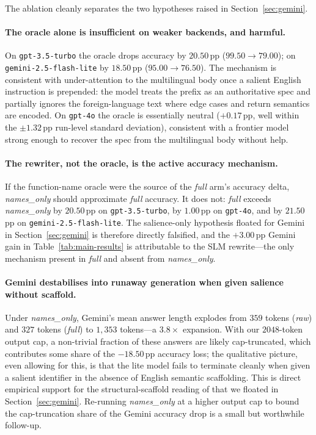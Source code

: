 \documentclass[11pt,a4paper,twocolumn]{article}
\begin{document}
The ablation cleanly separates the two hypotheses raised in Section~\ref{sec:gemini}.

\paragraph{The oracle alone is insufficient on weaker backends, and harmful.} On \texttt{gpt-3.5-turbo} the oracle drops accuracy by $20.50$\,pp ($99.50 \rightarrow 79.00$); on \texttt{gemini-2.5-flash-lite} by $18.50$\,pp ($95.00 \rightarrow 76.50$). The mechanism is consistent with under-attention to the multilingual body once a salient English instruction is prepended: the model treats the prefix as an authoritative spec and partially ignores the foreign-language text where edge cases and return semantics are encoded. On \texttt{gpt-4o} the oracle is essentially neutral ($+0.17$\,pp, well within the $\pm 1.32$\,pp run-level standard deviation), consistent with a frontier model strong enough to recover the spec from the multilingual body without help.

\paragraph{The rewriter, not the oracle, is the active accuracy mechanism.} If the function-name oracle were the source of the \textit{full} arm's accuracy delta, \textit{names\_only} should approximate \textit{full} accuracy. It does not: \textit{full} exceeds \textit{names\_only} by $20.50$\,pp on \texttt{gpt-3.5-turbo}, by $1.00$\,pp on \texttt{gpt-4o}, and by $21.50$\,pp on \texttt{gemini-2.5-flash-lite}. The salience-only hypothesis floated for Gemini in Section~\ref{sec:gemini} is therefore directly falsified, and the $+3.00$\,pp Gemini gain in Table~\ref{tab:main-results} is attributable to the SLM rewrite---the only mechanism present in \textit{full} and absent from \textit{names\_only}.

\paragraph{Gemini destabilises into runaway generation when given salience without scaffold.} Under \textit{names\_only}, Gemini's mean answer length explodes from $359$ tokens (\textit{raw}) and $327$ tokens (\textit{full}) to $1{,}353$ tokens---a $3.8\times$ expansion. With our $2048$-token output cap, a non-trivial fraction of these answers are likely cap-truncated, which contributes some share of the $-18.50$\,pp accuracy loss; the qualitative picture, even allowing for this, is that the lite model fails to terminate cleanly when given a salient identifier in the absence of English semantic scaffolding. This is direct empirical support for the structural-scaffold reading of \cite{ma2025sketch} that we floated in Section~\ref{sec:gemini}. Re-running \textit{names\_only} at a higher output cap to bound the cap-truncation share of the Gemini accuracy drop is a small but worthwhile follow-up.
\end{document}
